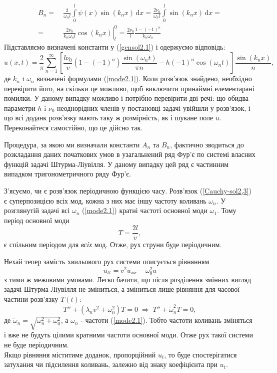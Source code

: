 \begin{equation*}
    \begin{aligned}
        B_n =&\ \frac{2}{\omega_n l} \int\limits_0^l \psi(x) \sin(k_n x) \,\mathrm{d}x = \frac{2\nu_0}{\omega_n l} \int\limits_0^l \sin(k_n x) \,\mathrm{d}x =\\
        =&\ \left.\frac{2\nu_0}{k_n\omega_n l} \cos(k_n x)\right|_l^0 = \frac{2\nu_0}{l} \frac{1 - (-1)^n}{k_n\omega_n}
    \end{aligned}
\end{equation*}
Підставляємо визначені константи у (\ref{gensol2.1}) і одержуємо відповідь:
\begin{equation} \label{Cauchy-sol2,3}
    u(x,t) = \frac{2}{\pi}\sum^{\infty}_{n=1} \left[\frac{l \nu_0}{v} (1 - (-1)^n)\frac{\sin(\omega_n t)}{\pi n} - h(-1)^n\cos(\omega_n t)\right] \frac{\sin(k_n x)}{n},
\end{equation}
де $k_n$ i $\omega_n$ визначені формулами (\ref{mode2.1}).  Коли розв'язок знайдено, необхідно перевірити його, на скільки це можливо, щоб виключити принаймні елементарані помилки. У даному випадку можливо і потрібно перевірити дві речі: що обидва параметри $h$ i $\nu_0$ неоднорідних членів у постановці задачі увійшли у розв'язок, і що всі доданк розв'язку мають таку ж розмірність, як і шукане поле $u$. Переконайтеся самостійно, що це дійсно так.

Процедура, за якою ми визначали константи $A_n$ та $B_n$, фактично зводиться до розкладання даних початкових умов в узагальнений ряд Фур'є по системі власних функцій задачі Штурма-Ліувілля. У даному випадку цей ряд є частинним випадком тригонометричного ряду Фур'є. 

З'ясуємо, чи є розв'язок періодичною функцією часу. Розв'язок (\ref{Cauchy-sol2,3}) є суперпозицією всіх мод, кожна з них має іншу частоту коливань $\omega_n$. У розглянутій задачі  всі $\omega_n$ (\ref{mode2.1}) кратні частоті основної моди $\omega_1$. Тому період основної моди \[T = \frac{2l}{v},\] є спільним періодом для \textit{всіх} мод. Отже, рух струни буде періодичним. 

Нехай тепер замість хвильового рух системи описується рівнянням \[u_{tt} = v^2 u_{xx} - \omega_0^2 u\] з тими ж межовими умовами. Легко бачити, що після розділення змінних вигляд задачі Штурма-Ліувілля не зміниться, а зміниться лише рівняння для часової частини розв'язку $T(t)$:
\begin{equation}
    T'' + (\lambda_n v^2 + \omega_0^2) T = 0
    \;\Rightarrow\; 
    T'' + \widetilde{\omega}_n^2 T = 0,
\end{equation}
де $\widetilde{\omega}_n = \sqrt{\omega_n^2 + \omega_0^2}$, а $\omega_n$ - частоти (\ref{mode2.1}). Тобто частоти коливань зміняться і вже не будуть цілими кратними частоти основної моди. Отже рух такої системи не буде періодичним.\\
Якщо рівняння міститиме доданок, пропорційний $u_t$, то буде спостерігатися затухання чи підсилення коливань, залежно від знаку коефіцієнта при $u_t$.

%